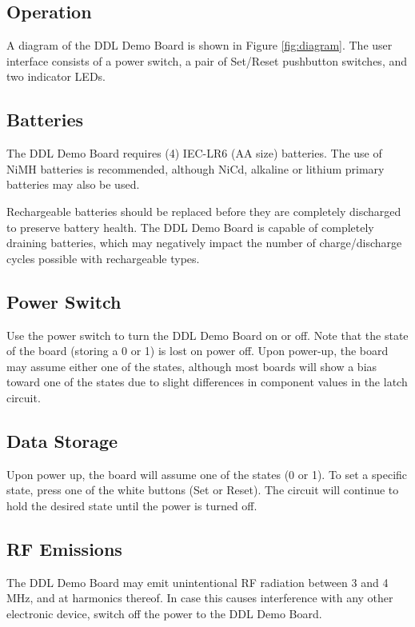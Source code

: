 \documentclass{article}
\begin{document}
\setlength{\columnsep}{0.25in}
\begin{multicols}{2}


\section*{Operation}
\noindent A diagram of the DDL Demo Board is shown in Figure
\ref{fig:diagram}. The user interface consists of a power switch, a
pair of Set/Reset pushbutton switches, and two indicator LEDs.

\subsection*{Batteries}
\noindent The DDL Demo Board requires (4) IEC-LR6 (AA size) batteries.  The use
of NiMH batteries is recommended, although NiCd, alkaline or lithium
primary batteries may also be used.

Rechargeable batteries should be replaced before they are completely
discharged to preserve battery health. The DDL Demo Board is capable
of completely draining batteries, which may negatively impact the
number of charge/discharge cycles possible with rechargeable types.

\subsection*{Power Switch}
\noindent Use the power switch to turn the DDL Demo Board on or off.  Note that
the state of the board (storing a 0 or 1) is lost on power off.  Upon
power-up, the board may assume either one of the states, although
most boards will show a bias toward one of the states due to slight
differences in component values in the latch circuit.

\subsection*{Data Storage}
\noindent Upon power up, the board will assume one of the states (0 or
1).  To set a specific state, press one of the white buttons (Set or
Reset).  The circuit will continue to hold the desired state until the
power is turned off.

\subsection*{RF Emissions}
The DDL Demo Board may emit unintentional RF radiation between 3 and 4
MHz, and at harmonics thereof.  In case this causes interference with
any other electronic device, switch off the power to the DDL Demo
Board.


\end{multicols}
\end{document}
